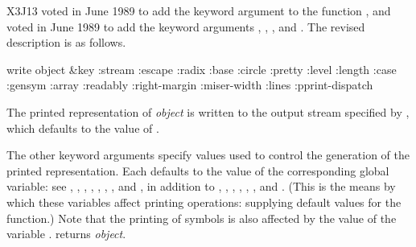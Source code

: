 \begin{newer}
X3J13 voted in June 1989  to add the keyword argument
 to the function , and voted in June 1989 
to add the keyword arguments , , ,
and .
The revised description
is as follows.

\begin{defun}[Function]
write object &key :stream :escape :radix :base :circle
   :pretty :level :length :case :gensym :array :readably
   :right-margin :miser-width :lines :pprint-dispatch

The printed representation of {\it object} is written to the output stream
specified by , which defaults to the value of .

The other keyword arguments specify values used to control the
generation of the printed representation.  Each defaults to the
value of the corresponding global variable: see ,
, , , ,
, , and , in addition to
,
,
,
,
,
,
and .
(This is the means by which these variables affect printing operations:
supplying default values for the  function.)
Note that the printing of symbols is also affected by the value
of the variable .
 returns {\it object}.
\end{defun}
\end{newer}

